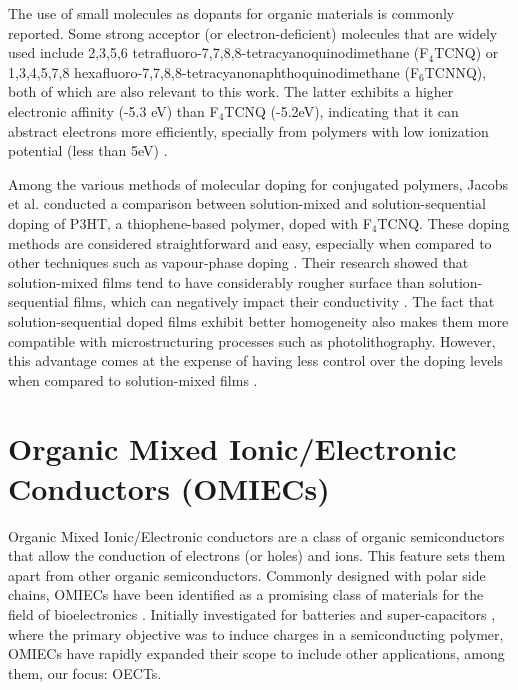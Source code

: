 The use of small molecules as dopants for organic materials is commonly reported. Some strong acceptor (or electron-deficient) molecules that are widely used include 2,3,5,6 tetrafluoro-7,7,8,8-tetracyanoquinodimethane (F$_{4}$TCNQ) or 1,3,4,5,7,8 hexafluoro-7,7,8,8-tetracyanonaphthoquinodimethane (F$_{6}$TCNNQ), both of which are also relevant to this work. The latter exhibits a higher electronic affinity (-5.3 eV) than F$_{4}$TCNQ (-5.2eV), indicating that it can abstract electrons more efficiently, specially from polymers with low ionization potential (less than 5eV) \cite{kieferDoubleDopingConjugated2019}%
.

Among the various methods of molecular doping for conjugated polymers, Jacobs et al. conducted a comparison between solution-mixed and solution-sequential doping of P3HT, a thiophene-based polymer, doped with F$_{4}$TCNQ. These doping methods are considered straightforward and easy, especially when compared to other techniques such as vapour-phase doping \cite{fontanaEvaporationVsSolution2019}. Their research showed that solution-mixed films tend to have considerably rougher surface than solution-sequential films, which can negatively impact their conductivity \cite{jacobsComparisonSolutionmixedSequentially2016}. The fact that solution-sequential doped films exhibit better homogeneity also makes them more compatible with microstructuring processes such as photolithography. However, this advantage comes at the expense of having less control over the doping levels when compared to solution-mixed films \cite{tanOrganicMixedIonic2022}.

\section{Organic Mixed Ionic/Electronic Conductors (OMIECs)} \label{sec:omiecs}

Organic Mixed Ionic/Electronic conductors are a class of organic semiconductors that allow the conduction of electrons (or holes) and ions. This feature sets them apart from other organic semiconductors. %
Commonly designed with polar side chains, OMIECs have been identified as a promising class of materials for the field of bioelectronics
\cite{giovannittiEnergeticControlRedoxActive2020}. Initially investigated for batteries and super-capacitors \cite{snookConductingpolymerbasedSupercapacitorDevices2011}
\cite{liangOrganicElectrodeMaterials2012}, where the primary objective was to induce charges in a semiconducting polymer, OMIECs have rapidly expanded their scope to include other applications, among them, our focus: OECTs.

